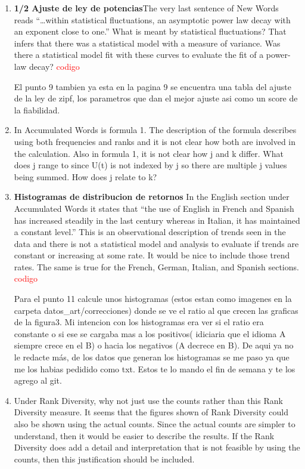 \documentclass{article}
\begin{document}
\begin{enumerate}
\item \textbf{1/2 Ajuste de ley de potencias}The very last sentence of New Words reads “…within statistical %
fluctuations, an asymptotic power law decay with an exponent close to
one.” What is meant by statistical fluctuations? That infers that
there was a statistical model with a measure of variance. Was there a
statistical model fit with these curves to evaluate the fit of a
power-law decay? \textcolor{red}{codigo}

El punto 9 tambien ya esta en la pagina 9 se encuentra una tabla del ajuste de la ley de zipf, los parametros que dan el mejor ajuste asi como un score de la fiabilidad.



\item  In Accumulated Words is formula 1. The description of the formula 
describes using both frequencies and ranks and it is not clear how
both are involved in the calculation. Also in formula 1, it is not
clear how j and k differ. What does j range to since U(t) is not
indexed by j so there are multiple j values being summed. How does j
relate to k?


\item \textbf{Histogramas de distribucion de retornos }In the English section under Accumulated Words it states that “the 
use of English in French and Spanish has increased steadily in the
last century whereas in Italian, it has maintained a constant level.”
This is an observational description of trends seen in the data and
there is not a statistical model and analysis to evaluate if trends
are constant or increasing at some rate. It would be nice to include
those trend rates. The same is true for the French, German, Italian,
and Spanish sections. \textcolor{red}{codigo}


Para el punto 11 calcule unos histogramas (estos estan como imagenes en la
carpeta datos\_art/correcciones) donde se ve el ratio al que crecen las graficas
de la figura3. Mi intencion con los histogramas era ver si el ratio era
constante o si ese se cargaba mas a los positivos( idiciaria que el idioma A
siempre crece en el B) o hacia los negativos (A decrece en B). De aqui ya no le
redacte más, de los datos que generan los histogramas se me paso ya que me los
habias pedidido como txt. Estos te lo mando el fin de semana y te los agrego al
git.

\item Under Rank Diversity, why not just use the counts rather than this
Rank Diversity measure. It seems that the figures shown of Rank
Diversity could also be shown using the actual counts. Since the
actual counts are simpler to understand, then it would be easier to
describe the results. If the Rank Diversity does add a detail and
interpretation that is not feasible by using the counts, then this
justification should be included.



\end{enumerate}
\end{document}
